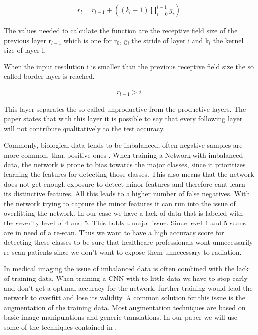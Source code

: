 \documentclass[
a4paper, 
12pt,
grayscalebody, %
abstract=on,
twoside, BCOR10mm, 12pt, DIV13,headinclude, footexclude, final, abstracton, openright
]{ibireprt}
\numberwithin{equation}{chapter}
\numberwithin{table}{chapter}
\numberwithin{figure}{chapter}
\numberwithin{algorithm}{chapter}
\numberwithin{example}{chapter}
\numberwithin{example}{chapter}
\begin{document}
\begin{align}
	r_l = r_{l-1}+((k_l-1)\prod_{i=0}^{l-1}g_i)
\end{align}

The values needed to calculate the function are the receptive field size of the previous layer r$_{l-1}$ which is one for r$_0$, g$_i$ the stride of layer i and k$_l$ the kernel size of layer l.

When the input resolution i is smaller than the previous receptive field size the so called border layer is reached.

\begin{align}
	r_{l-1} > i
\end{align} 

This layer separates the so called unproductive from the productive layers. The paper states that with this layer it is possible to say that every following layer will not contribute qualitatively to the test accuracy.


Commonly, biological data tends to be imbalanced, often negative samples are more common, than positive ones \cite{Alzubaidi2021}. When training a Network with imbalanced data, the network is prone to bias towards the major classes, since it prioritizes learning the features for detecting those classes. This also means that the network does not get enough exposure to detect minor features and therefore cant learn its distinctive features. All this leads to a higher number of false negatives. With the network trying to capture the minor features it can run into the issue of overfitting the network. In our case we have a lack of data that is labeled with the severity level of 4 and 5. This holds a major issue. Since level 4 and 5 scans are in need of a re-scan. Thus we want to have a high accuracy score for detecting these classes to be sure that healthcare professionals wont unnecessarily re-scan patients since we don't want to expose them unnecessary to radiation.%


In medical imaging the issue of imbalanced data is often combined with the lack of training data. When training a CNN with to little data we have to stop early and don't get a optimal accuracy for the network, further training would lead the network to overfitt and lose its validity. A common solution for this issue is the augmentation of the training data. Most augmentation techniques are based on basic image manipulations and generic translations. In our paper we will use some of the techniques contained in \cite{Shorten2019}.
\end{document}
